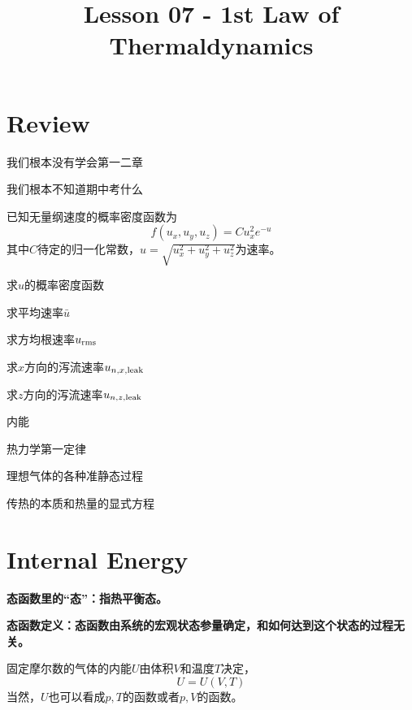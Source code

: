 \documentclass[CJK]{beamer}
\title{Lesson 07 - 1st Law of Thermaldynamics}
\author{}
\date{}
\begin{document}


\section{Review}

\begin{frame}
\bch
\bitem
\item{我们根本没有学会第一二章}
\item{我们根本不知道期中考什么}
\eitem
\ech
\end{frame}

\begin{frame}
\bch
{\blue 已知无量纲速度的概率密度函数为
$$f(u_x,u_y,u_z) = Cu_x^2 e^{-u}$$
其中$C$待定的归一化常数，$u = \sqrt{u_x^2+u_y^2+u_z^2}$为速率。
\bitem
\item{求$u$的概率密度函数}
\item{求平均速率$\bar{u}$}
\item{求方均根速率$u_{\rm rms}$}
\item{求$x$方向的泻流速率$u_{n, x, \rm leak}$}
\item{求$z$方向的泻流速率$u_{n, z, \rm leak}$}
\eitem
}
\ech
\end{frame}


\begin{frame}
\bch
\bitem
\item{内能}
\item{热力学第一定律}
\item{理想气体的各种准静态过程}
\item{传热的本质和热量的显式方程}
\eitem
\ech
\end{frame}


\section{Internal Energy}

\begin{frame}
\bch
\bitem
\item{\bf 态函数里的“态”：指热平衡态。}
\item{\bf 态函数定义：态函数由系统的宏观状态参量确定，和如何达到这个状态的过程无关。}
\eitem

\bex
固定摩尔数的气体的内能$U$由体积$V$和温度$T$决定，
$$ U  = U(V, T)$$
当然，$U$也可以看成$p, T$的函数或者$p, V$的函数。
\eex

\ech
\end{frame}
\end{document}

